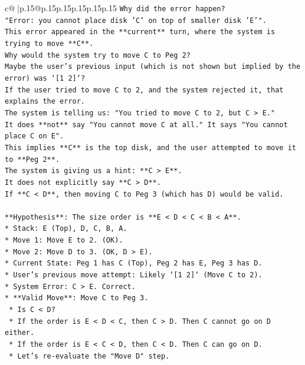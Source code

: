 \documentclass{article}
\begin{document}
{\begin{supertabular}{c@{$\;$}|p{.15\linewidth}@{}p{.15\linewidth}p{.15\linewidth}p{.15\linewidth}p{.15\linewidth}p{.15\linewidth}}
{{{\texttt{Why did the error happen?} \\
\texttt{"Error: you cannot place disk 'C' on top of smaller disk 'E'".} \\
\texttt{This error appeared in the **current** turn, where the system is trying to move **C**.} \\
\texttt{Why would the system try to move C to Peg 2?} \\
\texttt{Maybe the user's previous input (which is not shown but implied by the error) was `{[}1 2{]}`?} \\
\texttt{If the user tried to move C to 2, and the system rejected it, that explains the error.} \\
\texttt{The system is telling us: "You tried to move C to 2, but C > E."} \\
\texttt{It does **not** say "You cannot move C at all." It says "You cannot place C on E".} \\
\texttt{This implies **C** is the top disk, and the user attempted to move it to **Peg 2**.} \\
\texttt{The system is giving us a hint: **C > E**.} \\
\texttt{It does not explicitly say **C > D**.} \\
\texttt{If **C < D**, then moving C to Peg 3 (which has D) would be valid.} \\
\\ 
\texttt{**Hypothesis**: The size order is **E < D < C < B < A**.} \\
\texttt{*   Stack: E (Top), D, C, B, A.} \\
\texttt{*   Move 1: Move E to 2. (OK).} \\
\texttt{*   Move 2: Move D to 3. (OK, D > E).} \\
\texttt{*   Current State: Peg 1 has C (Top), Peg 2 has E, Peg 3 has D.} \\
\texttt{*   User's previous move attempt: Likely `{[}1 2{]}` (Move C to 2).} \\
\texttt{*   System Error: C > E. Correct.} \\
\texttt{*   **Valid Move**: Move C to Peg 3.} \\
\texttt{    *   Is C < D?} \\
\texttt{    *   If the order is E < D < C, then C > D. Then C cannot go on D either.} \\
\texttt{    *   If the order is E < C < D, then C < D. Then C can go on D.} \\
\texttt{    *   Let's re{-}evaluate the "Move D" step.} \\
}}}
\end{supertabular}}
\end{document}
